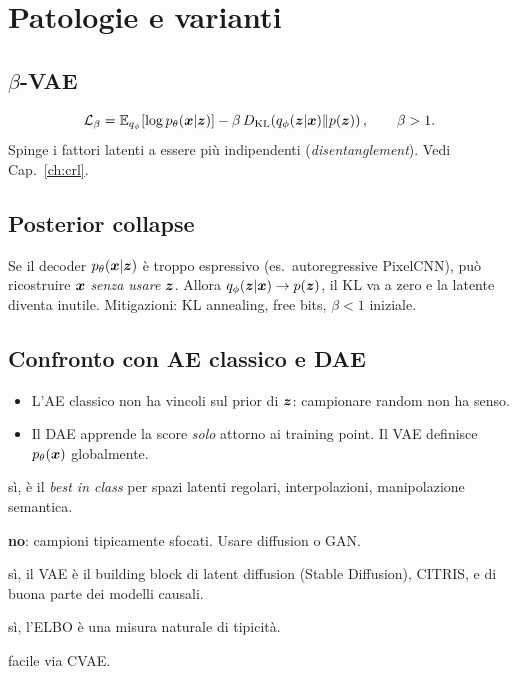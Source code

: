 \section{Patologie e varianti}

\subsection{$\beta$-VAE}
\[
\mathcal{L}_\beta = \mathbb{E}_{q_\phi}[\log p_\theta(\bm{x}|\bm{z})] - \beta\, D_{\mathrm{KL}}\!\left(q_\phi(\bm{z}|\bm{x}) \| p(\bm{z})\right), \qquad \beta > 1.
\]
Spinge i fattori latenti a essere più indipendenti (\emph{disentanglement}). Vedi Cap.~\ref{ch:crl}.

\subsection{Posterior collapse}
Se il decoder $p_\theta(\bm{x}|\bm{z})$ è troppo espressivo (es.\ autoregressive PixelCNN), può ricostruire $\bm{x}$ \emph{senza usare} $\bm{z}$. Allora $q_\phi(\bm{z}|\bm{x}) \to p(\bm{z})$, il KL va a zero e la latente diventa inutile. Mitigazioni: KL annealing, free bits, $\beta < 1$ iniziale.

\subsection{Confronto con AE classico e DAE}
\begin{itemize}
  \item L'AE classico non ha vincoli sul prior di $\bm{z}$: campionare random non ha senso.
  \item Il DAE apprende la score \emph{solo} attorno ai training point. Il VAE definisce $p_\theta(\bm{x})$ globalmente.
\end{itemize}

\begin{tcolorbox}[mybox, title={Quando usare un VAE}]
\begin{description}[leftmargin=4em,style=nextline]
  \item[Representation learning con prior strutturato] sì, è il \emph{best in class} per spazi latenti regolari, interpolazioni, manipolazione semantica.
  \item[Generazione fotorealistica] \textbf{no}: campioni tipicamente sfocati. Usare diffusion o GAN.
  \item[Backbone modulare] sì, il VAE è il building block di latent diffusion (Stable Diffusion), CITRIS, e di buona parte dei modelli causali.
  \item[Anomaly detection] sì, l'ELBO è una misura naturale di tipicità.
  \item[Conditional generation] facile via CVAE.
\end{description}
\end{tcolorbox}

